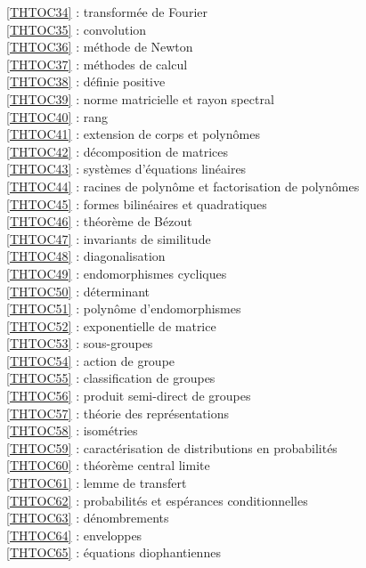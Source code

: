 \ref {THTOC34} : transformée de Fourier\\
\ref {THTOC35} : convolution\\
\ref {THTOC36} : méthode de Newton\\
\ref {THTOC37} : méthodes de calcul\\
\ref {THTOC38} : définie positive\\
\ref {THTOC39} : norme matricielle et rayon spectral\\
\ref {THTOC40} : rang\\
\ref {THTOC41} : extension de corps et polynômes\\
\ref {THTOC42} : décomposition de matrices\\
\ref {THTOC43} : systèmes d'équations linéaires\\
\ref {THTOC44} : racines de polynôme et factorisation de polynômes\\
\ref {THTOC45} : formes bilinéaires et quadratiques\\
\ref {THTOC46} : théorème de Bézout\\
\ref {THTOC47} : invariants de similitude\\
\ref {THTOC48} : diagonalisation\\
\ref {THTOC49} : endomorphismes cycliques\\
\ref {THTOC50} : déterminant\\
\ref {THTOC51} : polynôme d'endomorphismes\\
\ref {THTOC52} : exponentielle de matrice\\
\ref {THTOC53} : sous-groupes\\
\ref {THTOC54} : action de groupe\\
\ref {THTOC55} : classification de groupes\\
\ref {THTOC56} : produit semi-direct de groupes\\
\ref {THTOC57} : théorie des représentations\\
\ref {THTOC58} : isométries\\
\ref {THTOC59} : caractérisation de distributions en probabilités\\
\ref {THTOC60} : théorème central limite\\
\ref {THTOC61} : lemme de transfert\\
\ref {THTOC62} : probabilités et espérances conditionnelles\\
\ref {THTOC63} : dénombrements\\
\ref {THTOC64} : enveloppes\\
\ref {THTOC65} : équations diophantiennes\\
